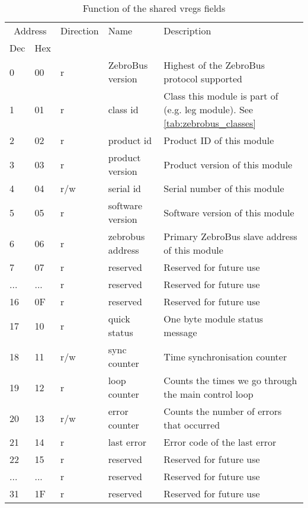 \begin{table}[H]
    \begin{center}
    \caption{Function of the shared vregs fields}
    \label{tab:shared_fields}
    \begin{tabularx}{\textwidth}{llllX}
    \toprule
    \multicolumn{2}{c}{Address} & Direction & Name & Description \\
    Dec & Hex &   &   \\
    \midrule
    0  & 00  & r   & ZebroBus version & Highest of the ZebroBus protocol supported \\
    1  & 01  & r   & class id         & Class this module is part of (e.g. leg module). See \cref{tab:zebrobus_classes} \\
    2  & 02  & r   & product id       & Product ID of this module\\
    3  & 03  & r   & product version  & Product version of this module \\
    4  & 04  & r/w & serial id        & Serial number of this module \\
    5  & 05  & r   & software version & Software version of this module \\
    6  & 06  & r   & zebrobus address & Primary ZebroBus slave address of this module \\
    7  & 07  & r    & reserved         & Reserved for future use \\
    ...  & ...  & r & reserved      & Reserved for future use \\
    16  & 0F  & r & reserved        & Reserved for future use \\
    17 & 10  & r   & quick status     & One byte module status message \\
    18 & 11  & r/w & sync counter     & Time synchronisation counter \\
    19 & 12  & r   & loop counter     & Counts the times we go through the main control loop \\
    20 & 13  & r/w & error counter    & Counts the number of errors that occurred \\
    21 & 14 & r    & last error        & Error code of the last error \\
    22 & 15  & r & reserved         & Reserved for future use  \\
    ... & ... & r & reserved        & Reserved for future use \\
    31 & 1F & r & reserved          & Reserved for future use \\
    \bottomrule
    \end{tabularx}
    \end{center}
\end{table}

